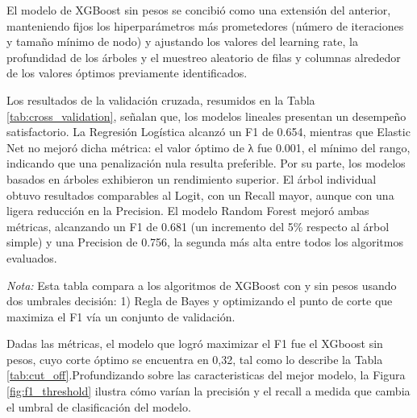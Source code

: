 El modelo de XGBoost sin pesos se concibió como una extensión del anterior, manteniendo fijos los hiperparámetros más prometedores (número de iteraciones y tamaño mínimo de nodo) y ajustando los valores del learning rate, la profundidad de los árboles y el muestreo aleatorio de filas y columnas alrededor de los valores óptimos previamente identificados.



Los resultados de la validación cruzada, resumidos en la Tabla \ref{tab:cross_validation}, señalan que, los modelos lineales presentan un desempeño satisfactorio. La Regresión Logística alcanzó un F1 de 0.654, mientras que Elastic Net no mejoró dicha métrica: el valor óptimo de λ fue 0.001, el mínimo del rango, indicando que una penalización nula resulta preferible. Por su parte, los modelos basados en árboles exhibieron un rendimiento superior. El árbol individual obtuvo resultados comparables al Logit, con un Recall mayor, aunque con una ligera reducción en la Precision. El modelo Random Forest mejoró ambas métricas, alcanzando un F1 de 0.681 (un incremento del 5\% respecto al árbol simple) y una Precision de 0.756, la segunda más alta entre todos los algoritmos evaluados.

\begin{table}[!h]
    \centering
    \caption{Resultados de la optimización de puntos de corte de los modelos de XGBoost}
    \label{tab:cut_off}
    
    \end{table}
    
    \medskip
    \begin{minipage}{\textwidth}
    
    \tiny
    \textit{Nota:} Esta tabla compara a los algoritmos de XGBoost con y sin pesos usando dos umbrales decisión: 1) Regla de Bayes y optimizando el punto de corte que maximiza el F1 vía un conjunto de validación. 
\end{minipage}



Dadas las métricas, el modelo que logró maximizar el F1 fue el XGboost sin pesos, cuyo corte óptimo se encuentra en 0,32, tal como lo describe la Tabla \ref{tab:cut_off}.Profundizando sobre las caracteristicas del mejor modelo,  la Figura \ref{fig:f1_threshold} ilustra cómo varían la precisión y el recall a medida que cambia el umbral de clasificación del modelo.


